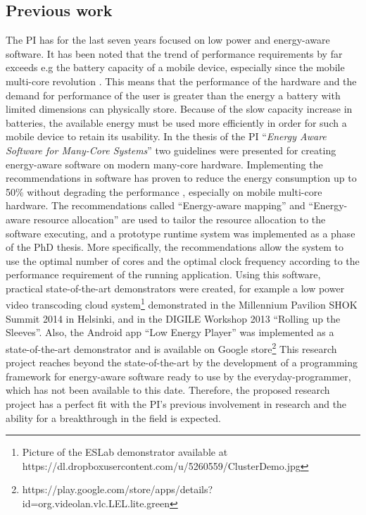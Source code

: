 \documentclass{article}
\begin{document}
\subsection{Previous work}
The PI has for the last seven years focused on low power and energy-aware software. 
It has been noted that the trend of performance requirements by far exceeds e.g the battery capacity of a mobile device, especially since the mobile multi-core revolution \cite{BatteryCapacity,CPUCapacity}. 
This means that the performance of the hardware and the demand for performance of the user is greater than the energy a battery with limited dimensions can physically store. 
Because of the slow capacity increase in batteries, the available energy must be used more efficiently in order for such a mobile device to retain its usability.
In the thesis of the PI ``\textit{Energy Aware Software for Many-Core Systems}'' two guidelines were presented for creating energy-aware software on modern many-core hardware. 
Implementing the recommendations in software has proven to reduce the energy consumption up to 50\% without degrading the performance \cite{HolmbackaHipeac}, especially on mobile multi-core hardware. 
The recommendations called ``Energy-aware mapping'' and ``Energy-aware resource allocation'' are used to tailor the resource allocation to the software executing, 
and a prototype runtime system was implemented as a phase of the PhD thesis.
More specifically, the recommendations allow the system to use the optimal number of cores and the optimal clock frequency according to the performance requirement of the running application.
Using this software, practical state-of-the-art demonstrators were created, for example a low power video transcoding cloud system\footnote{Picture of the ESLab demonstrator available at https://dl.dropboxusercontent.com/u/5260559/ClusterDemo.jpg} demonstrated in the Millennium Pavilion SHOK Summit 2014 in Helsinki, and in the DIGILE Workshop 2013 ``Rolling up the Sleeves''.
Also, the Android app ``Low Energy Player'' was implemented as a state-of-the-art demonstrator and is available on Google store\footnote{https://play.google.com/store/apps/details?id=org.videolan.vlc.LEL.lite.green}
This research project reaches beyond the state-of-the-art by the development of a programming framework for energy-aware software ready to use by the everyday-programmer, 
which has not been available to this date.
Therefore, the proposed research project has a perfect fit with the PI's previous involvement in research and the ability for a breakthrough in the field is expected.
\end{document}
